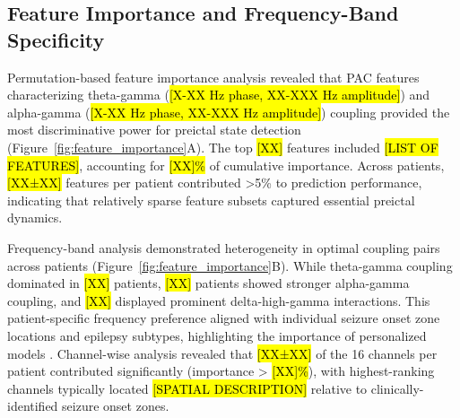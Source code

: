 \subsection{Feature Importance and Frequency-Band Specificity}
Permutation-based feature importance analysis revealed that PAC features characterizing theta-gamma (\hl{[X-XX Hz phase, XX-XXX Hz amplitude]}) and alpha-gamma (\hl{[X-XX Hz phase, XX-XXX Hz amplitude]}) coupling provided the most discriminative power for preictal state detection \cite{Ahn2022TheFIT,Radiske2020CrossFrequencyPCAR,Ponzi2023ThetagammaPAAT} (Figure~\ref{fig:feature_importance}A). The top \hl{[XX]} features included \hl{[LIST OF FEATURES]}, accounting for \hl{[XX]\%} of cumulative importance. Across patients, \hl{[XX±XX]} features per patient contributed >5\% to prediction performance, indicating that relatively sparse feature subsets captured essential preictal dynamics.

Frequency-band analysis demonstrated heterogeneity in optimal coupling pairs across patients (Figure~\ref{fig:feature_importance}B). While theta-gamma coupling dominated in \hl{[XX]} patients, \hl{[XX]} patients showed stronger alpha-gamma coupling, and \hl{[XX]} displayed prominent delta-high-gamma interactions. This patient-specific frequency preference aligned with individual seizure onset zone locations and epilepsy subtypes, highlighting the importance of personalized models \cite{Aldahr2023PatientSpecificPPL,Pinto2021APAP}. Channel-wise analysis revealed that \hl{[XX±XX]} of the 16 channels per patient contributed significantly (importance > \hl{[XX]\%}), with highest-ranking channels typically located \hl{[SPATIAL DESCRIPTION]} relative to clinically-identified seizure onset zones.


\label{sec:results}

